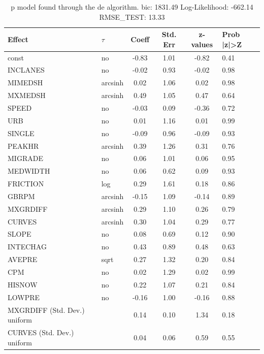 \begin{table}
	\caption{p model found through the de algorithm. bic: 1831.49 Log-Likelihood: -662.14 RMSE_TEST: 13.33}
	\begin{center}
		\begin{tabular}{|l|l|c|c|c|l|}
			\hline
			Effect & $\tau$ & Coeff & Std. Err & z-values & Prob |z|>Z \\
			\hline
			const & no & -0.83 & 1.01 & -0.82 & 0.41 \\
			\hline
			INCLANES & no & -0.02 & 0.93 & -0.02 & 0.98 \\
			\hline
			MIMEDSH & arcsinh & 0.02 & 1.06 & 0.02 & 0.98 \\
			\hline
			MXMEDSH & arcsinh & 0.49 & 1.05 & 0.47 & 0.64 \\
			\hline
			SPEED & no & -0.03 & 0.09 & -0.36 & 0.72 \\
			\hline
			URB & no & 0.01 & 1.16 & 0.01 & 0.99 \\
			\hline
			SINGLE & no & -0.09 & 0.96 & -0.09 & 0.93 \\
			\hline
			PEAKHR & arcsinh & 0.39 & 1.26 & 0.31 & 0.76 \\
			\hline
			MIGRADE & no & 0.06 & 1.01 & 0.06 & 0.95 \\
			\hline
			MEDWIDTH & no & 0.06 & 0.62 & 0.09 & 0.93 \\
			\hline
			FRICTION & log & 0.29 & 1.61 & 0.18 & 0.86 \\
			\hline
			GBRPM & arcsinh & -0.15 & 1.09 & -0.14 & 0.89 \\
			\hline
			MXGRDIFF & arcsinh & 0.29 & 1.10 & 0.26 & 0.79 \\
			\hline
			CURVES & arcsinh & 0.30 & 1.04 & 0.29 & 0.77 \\
			\hline
			SLOPE & no & 0.08 & 0.69 & 0.12 & 0.90 \\
			\hline
			INTECHAG & no & 0.43 & 0.89 & 0.48 & 0.63 \\
			\hline
			AVEPRE & sqrt & 0.27 & 1.32 & 0.20 & 0.84 \\
			\hline
			CPM & no & 0.02 & 1.29 & 0.02 & 0.99 \\
			\hline
			HISNOW & no & 0.22 & 1.07 & 0.21 & 0.84 \\
			\hline
			LOWPRE & no & -0.16 & 1.00 & -0.16 & 0.88 \\
			\hline
			MXGRDIFF (Std. Dev.) uniform &  & 0.14 & 0.10 & 1.34 & 0.18 \\
			\hline
			CURVES (Std. Dev.) uniform &  & 0.04 & 0.06 & 0.59 & 0.55 \\

\end{tabular}
\end{center}
\end{table}
